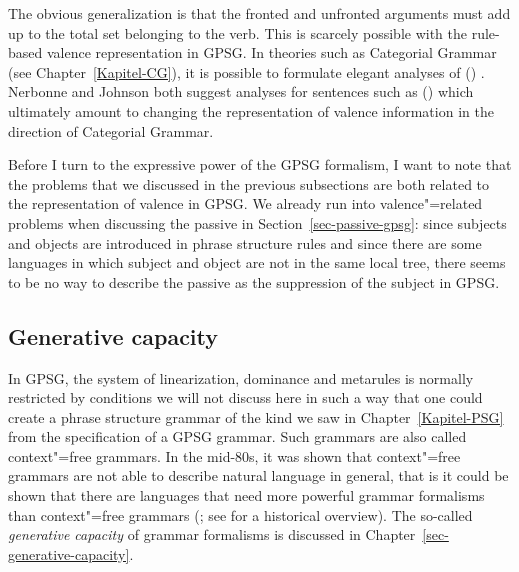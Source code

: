 \zl
The obvious generalization is that the fronted and unfronted arguments must add up to the total
set belonging to the verb. This is scarcely possible with the rule-based valence
representation in GPSG. In theories such as Categorial Grammar (see
Chapter~\ref{Kapitel-CG}), it is possible to formulate elegant analyses of ()
\citep{Geach70a}. Nerbonne and Johnson both suggest analyses for sentences such as () which
ultimately amount to changing the representation of valence information in the direction of
Categorial Grammar. 

Before I turn to the expressive power of the GPSG formalism, I want to note that the problems that
we discussed in the previous subsections are both related to the representation of valence in GPSG. We
already run into valence"=related problems when discussing the passive in Section~\ref{sec-passive-gpsg}: since subjects and objects are introduced in
phrase structure rules and since there are some languages in which subject and object are not in the
same local tree, there seems to be no way to describe the passive as the suppression of the subject
in GPSG.

\subsection{Generative capacity}

In GPSG, the system of linearization, dominance and metarules is normally restricted by conditions
we will not discuss here in such a way that one could create a phrase structure grammar of the kind
we saw in Chapter~\ref{Kapitel-PSG} from the specification of a GPSG grammar. Such grammars are also called
context"=free grammars. In the mid-80s, it was
shown that context"=free grammars are not able to describe natural language in general, that is it
could be shown that there are languages that need more powerful grammar formalisms than
context"=free grammars (\citealp{Shieber85a,Culy85a}; see  for a historical
overview). The so-called \emph{generative capacity} of grammar formalisms is discussed in
Chapter~\ref{sec-generative-capacity}.

